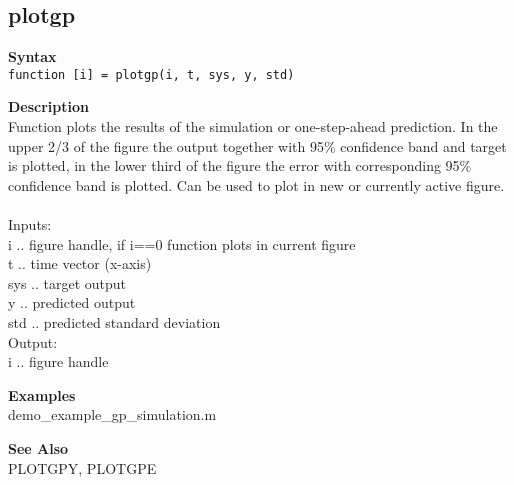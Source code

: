 \subsection*{plotgp} \label{fun:plotgp}


\textbf{Syntax}
\\  \texttt{function [i] = plotgp(i, t, sys, y, std)}

\textbf{Description}
\\ Function plots the results of the simulation or one-step-ahead
 prediction. In the upper 2/3 of the figure the output together with
 95\%
 confidence band and target is plotted, in the lower third of the
figure
 the error with corresponding 95\% confidence band is plotted.
Can be used
 to plot in new or currently active figure.
 \\
\\ Inputs:
\\ i .. figure handle, if i==0 function plots in current figure
\\ t .. time vector (x-axis)
\\ sys .. target output
\\ y .. predicted output
\\ std .. predicted standard deviation
\\ Output:
\\ i .. figure handle

\textbf{Examples}
\\ demo\_example\_gp\_simulation.m

\textbf{See Also}
\\ PLOTGPY, PLOTGPE
